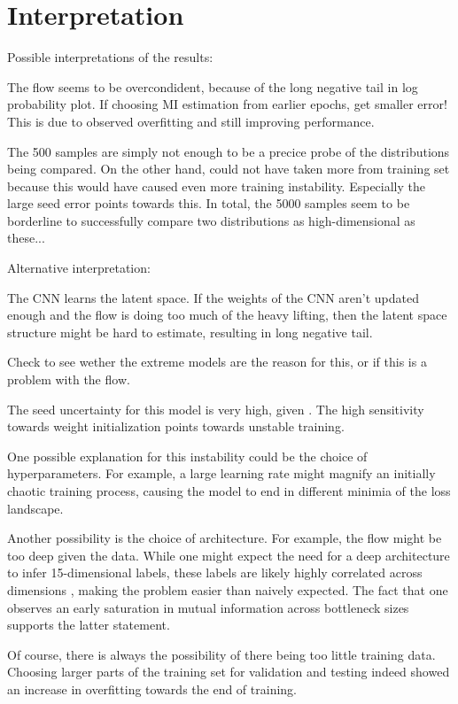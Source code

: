 \section{Interpretation}


Possible interpretations of the results:

The flow seems to be overcondident, because of the long negative tail in log probability plot. If choosing MI estimation from earlier epochs, get smaller error! This is due to observed overfitting and still improving performance.

The 500 samples are simply not enough to be a precice probe of the distributions being compared. On the other hand, could not have taken more from training set because this would have caused even more training instability. Especially the large seed error points towards this. In total, the 5000 samples seem to be borderline to successfully compare two distributions as high-dimensional as these...


Alternative interpretation:

The CNN learns the latent space. If the weights of the CNN aren't updated enough and the flow is doing too much of the heavy lifting, then the latent space structure might be hard to estimate, resulting in long negative tail.


Check to see wether the extreme models are the reason for this, or if this is a problem with the flow.

The seed uncertainty for this model is very high, given . The high sensitivity towards weight initialization points towards unstable training. 

One possible explanation for this instability could be the choice of hyperparameters. For example, a large learning rate might magnify an initially chaotic training process, causing the model to end in different minimia of the loss landscape. 

Another possibility is the choice of architecture. For example, the flow might be too deep given the data. While one might expect the need for a deep architecture to infer 15-dimensional labels, these labels are likely highly correlated across dimensions , making the problem easier than naively expected. The fact that one observes an early saturation in mutual information across bottleneck sizes supports the latter statement.

Of course, there is always the possibility of there being too little training data. Choosing larger parts of the training set for validation and testing indeed showed an increase in overfitting towards the end of training.


